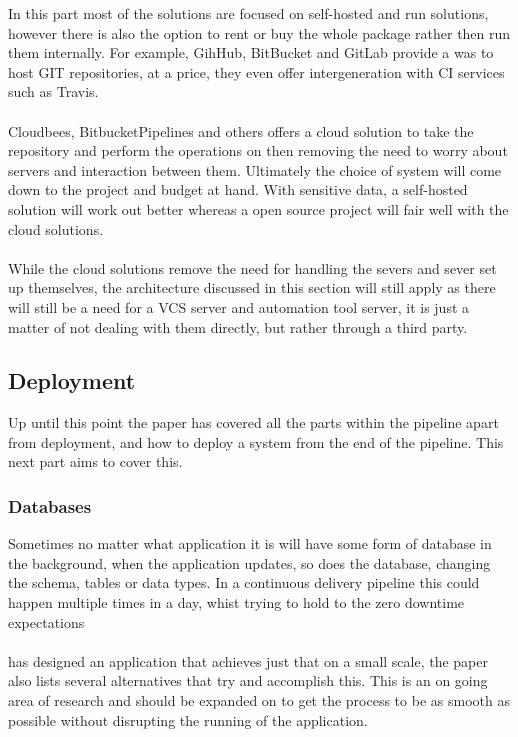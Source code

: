 In this part most of the solutions are focused on self-hosted and run solutions, however there is also the option to rent or buy the whole package rather then run them internally. For example, GihHub, BitBucket and GitLab provide a was to host GIT repositories, at a price, they even offer intergeneration with CI services such as Travis. 
\\\\
Cloudbees, BitbucketPipelines and others offers a cloud solution to take the repository and perform the operations on then removing the need to worry about servers and interaction between them. Ultimately the choice of system will come down to the project and budget at hand. With sensitive data, a self-hosted solution will work out better whereas a open source project will fair well with the cloud solutions.
\\\\
While the cloud solutions remove the need for handling the severs and sever set up themselves, the architecture discussed in this section will still apply as there will still be a need for a VCS server and automation tool server, it is just a matter of not dealing with them directly, but rather through a third party.

\subsection{Deployment}
\label{sec:deployment}

Up until this point the paper has covered all the parts within the pipeline apart from deployment, and how to deploy a system from the end of the pipeline. This next part aims to cover this.

\subsubsection{Databases}
Sometimes no matter what application it is will have some form of database in the background, when the application updates, so does the database, changing the schema, tables or data types. In a continuous delivery pipeline this could happen multiple times in a day, whist trying to hold to the zero downtime expectations
\\\\
\cite{updatedatabse} has designed an application that achieves just that on a small scale, the paper also lists several alternatives that try and accomplish this. This is an on going area of research and should be expanded on to get the process to be as smooth as possible without disrupting the running of the application.  

